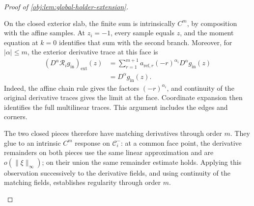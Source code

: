 \begin{proof}[Proof of \cref{obj:lem:global-holder-extension}]
\begin{enumerate}
On the closed exterior slab, the finite sum is intrinsically \(C^m\), by composition with the affine samples. At \(z_i=-1\), every sample equals \(z\), and the moment equation at \(k=0\) identifies that sum with the second branch. Moreover, for \(|\alpha|\le m\), the exterior derivative trace at this face is
\[
\begin{aligned}
(D^\alpha\mathscr R_i g_{\mathrm{in}})_{\mathrm{ext}}(z)
&=
\sum_{r=1}^{m+1}
a_{\mathrm{ref},r}(-r)^{\alpha_i}D^\alpha g_{\mathrm{in}}(z)\\
&=D^\alpha g_{\mathrm{in}}(z).
\end{aligned}
\]
Indeed, the affine chain rule gives the factors \((-r)^{\alpha_i}\), and continuity of the original derivative traces gives the limit at the face. Coordinate expansion then identifies the full multilinear traces. This argument includes the edges and corners.

The two closed pieces therefore have matching derivatives through order \(m\). They glue to an intrinsic \(C^m\) response on \(\mathcal C_i^-\): at a common face point, the derivative remainders on both pieces use the same linear approximation and are \(o(\|\xi\|_\infty)\); on their union the same remainder estimate holds. Applying this observation successively to the derivative fields, and using continuity of the matching fields, establishes regularity through order \(m\).


\end{enumerate}
\end{proof}
